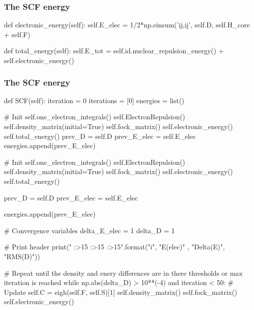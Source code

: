 \documentclass{beamer}
\begin{document}
\begin{frame}[fragile]
    \frametitle{The SCF energy}
    \begin{python}
def electronic_energy(self):
    self.E_elec = 1/2*np.einsum('ij,ij', self.D, self.H_core + self.F)

def total_energy(self):
    self.E_tot = self.id.nuclear_repulsion_energy() + self.electronic_energy()
    \end{python}
\end{frame}

\begin{frame}[fragile]
    \frametitle{The SCF energy}
    \begin{python}
def SCF(self):
    iteration = 0
    iterations = [0]
    energies = list()


    # Init
    self.one_electron_integrals()
    self.ElectronRepulsion()
    self.density_matrix(initial=True)
    self.fock_matrix()
    self.electronic_energy()
    self.total_energy()
    prev_D = self.D
    prev_E_elec = self.E_elec
    energies.append(prev_E_elec)
    \end{python}
\end{frame}
\begin{frame}[fragile]
    \begin{python}
   
        # Init
        self.one_electron_integrals()
        self.ElectronRepulsion()
        self.density_matrix(initial=True)
        self.fock_matrix()
        self.electronic_energy()
        self.total_energy()

        prev_D = self.D
        prev_E_elec = self.E_elec
        
        energies.append(prev_E_elec)
    \end{python}
\end{frame}
\begin{frame}[fragile]
    \begin{python}
        # Convergence variables
        delta_E_elec = 1
        delta_D = 1
        
        # Print header
        print("{} {:>15} {:>15} {:>15}".format("i", "E(elec)" , "Delta(E)", "RMS(D)"))
    \end{python}
\end{frame}
\begin{frame}[fragile]
    \begin{python} 
        # Repeat until the density and enery differences are in there thresholds or max iteration is reached
        while np.abs(delta_D) > 10**(-4) and iteration < 50:
            # Update
            self.C = eigh(self.F, self.S)[1]
            self.density_matrix()
            self.fock_matrix()
            self.electronic_energy()
        \end{python}
    \end{frame}
\end{document}
